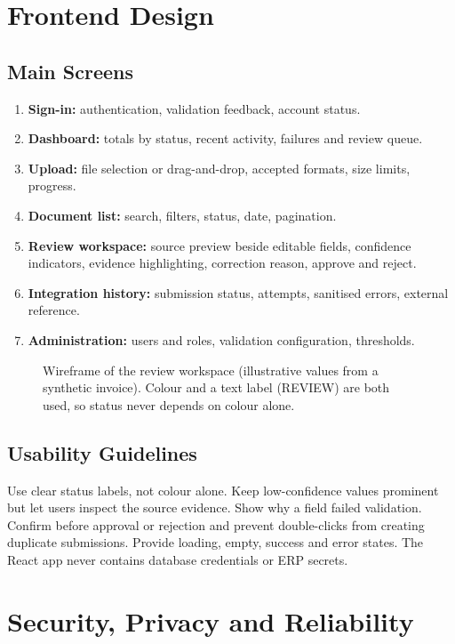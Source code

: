 \chapter{Frontend Design}
\section{Main Screens}
\begin{enumerate}
\item \textbf{Sign-in:} authentication, validation feedback, account status.
\item \textbf{Dashboard:} totals by status, recent activity, failures and review queue.
\item \textbf{Upload:} file selection or drag-and-drop, accepted formats, size limits, progress.
\item \textbf{Document list:} search, filters, status, date, pagination.
\item \textbf{Review workspace:} source preview beside editable fields, confidence indicators, evidence highlighting, correction reason, approve and reject.
\item \textbf{Integration history:} submission status, attempts, sanitised errors, external reference.
\item \textbf{Administration:} users and roles, validation configuration, thresholds.
\end{enumerate}

\begin{figure}[H]\centering
\resizebox{\textwidth}{!}{}
\caption{Wireframe of the review workspace (illustrative values from a synthetic invoice). Colour and a text label (REVIEW) are both used, so status never depends on colour alone.}\label{fig:wireframe}
\end{figure}

\section{Usability Guidelines}
Use clear status labels, not colour alone. Keep low-confidence values prominent but let users inspect the source evidence. Show why a field failed validation. Confirm before approval or rejection and prevent double-clicks from creating duplicate submissions. Provide loading, empty, success and error states. The React app never contains database credentials or ERP secrets.

\chapter{Security, Privacy and Reliability}
